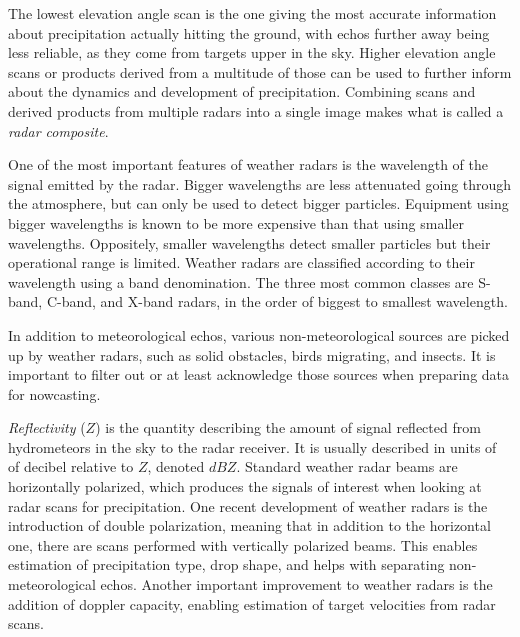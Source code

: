 The lowest elevation angle scan is the one giving the most accurate information about precipitation actually hitting the ground, with echos further away being less reliable, as they come from targets upper in the sky. Higher elevation angle scans or products derived from a multitude of those can be used to further inform about the dynamics and development of precipitation. Combining scans and derived products from multiple radars into a single image makes what is called a \textit{radar composite}.

One of the most important features of weather radars is the wavelength of the signal emitted by the radar. Bigger wavelengths are less attenuated going through the atmosphere, but can only be used to detect bigger particles. Equipment using bigger wavelengths is known to be more expensive than that using smaller wavelengths. Oppositely, smaller wavelengths detect smaller particles but their operational range is limited. Weather radars are classified according to their wavelength using a band denomination. The three most common classes are S-band, C-band, and X-band radars, in the order of biggest to smallest wavelength.

In addition to meteorological echos, various non-meteorological sources are picked up by weather radars, such as solid obstacles, birds migrating, and insects. It is important to filter out or at least acknowledge those sources when preparing data for nowcasting. 


\textit{Reflectivity} ($Z$) is the quantity describing the amount of signal reflected from hydrometeors in the sky to the radar receiver. It is usually described in units of of decibel relative to $Z$, denoted $dBZ$. Standard weather radar beams are horizontally polarized, which produces the signals of interest when looking at radar scans for precipitation. One recent development of weather radars is the introduction of double polarization, meaning that in addition to the horizontal one, there are scans performed with vertically polarized beams. This enables estimation of precipitation type, drop shape, and helps with separating non-meteorological echos. Another important improvement to weather radars is the addition of doppler capacity, enabling estimation of target velocities from radar scans. 


